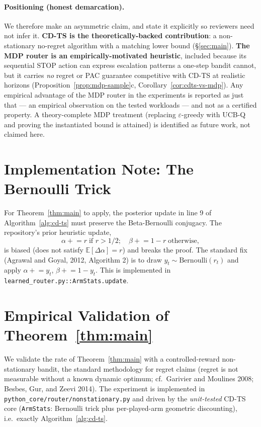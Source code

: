 \documentclass[11pt]{article}
\theoremstyle{definition}
\newcommand{\E}{\mathbb{E}}
\newcommand{\Bern}{\mathrm{Bernoulli}}
\begin{document}
\paragraph{Positioning (honest demarcation).} We therefore make an asymmetric claim, and state it explicitly so reviewers need not infer it. \textbf{CD-TS is the theoretically-backed contribution}: a non-stationary no-regret algorithm with a matching lower bound (\S\ref{sec:main}). \textbf{The MDP router is an empirically-motivated heuristic}, included because its sequential STOP action can express escalation patterns a one-step bandit cannot, but it carries \emph{no} regret or PAC guarantee competitive with CD-TS at realistic horizons (Proposition~\ref{prop:mdp-sample}c, Corollary~\ref{cor:cdts-vs-mdp}). Any empirical advantage of the MDP router in the experiments is reported as just that --- an empirical observation on the tested workloads --- and not as a certified property. A theory-complete MDP treatment (replacing $\varepsilon$-greedy with \textsc{UCB-Q} and proving the instantiated bound is attained) is identified as future work, not claimed here.

\section{Implementation Note: The Bernoulli Trick}
\label{sec:impl-note}

For Theorem~\ref{thm:main} to apply, the posterior update in line 9 of Algorithm~\ref{alg:cd-ts} must preserve the Beta-Bernoulli conjugacy. The repository's prior heuristic update,
\[
    \alpha \mathrel{+}= r \; \text{if } r > 1/2; \quad \beta \mathrel{+}= 1 - r \; \text{otherwise},
\]
is biased (does not satisfy $\E[\Delta \alpha] = r$) and breaks the proof. The standard fix (Agrawal and Goyal, 2012, Algorithm 2) is to draw $y_t \sim \Bern(r_t)$ and apply $\alpha \mathrel{+}= y_t$, $\beta \mathrel{+}= 1 - y_t$. This is implemented in \texttt{learned\_router.py::ArmStats.update}.

\section{Empirical Validation of Theorem~\ref{thm:main}}
\label{sec:empirical}

We validate the rate of Theorem~\ref{thm:main} with a controlled-reward
non-stationary bandit, the standard methodology for regret claims (regret is
not measurable without a known dynamic optimum; cf.\ Garivier and Moulines
2008; Besbes, Gur, and Zeevi 2014). The experiment is implemented in
\texttt{python\_core/router/nonstationary.py} and driven by the
\emph{unit-tested} CD-TS core (\texttt{ArmStats}: Bernoulli trick plus
per-played-arm geometric discounting), i.e.\ exactly Algorithm~\ref{alg:cd-ts}.
\end{document}
